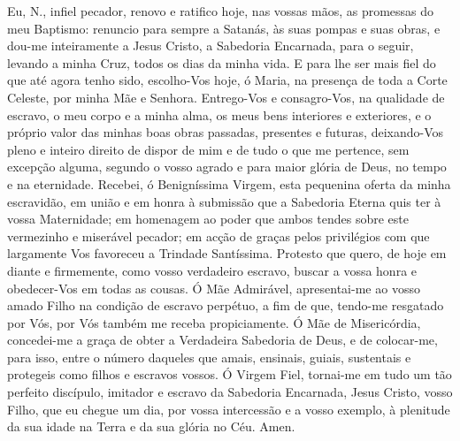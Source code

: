 Eu, {\redx N.}, infiel pecador, renovo e ratifico hoje, nas vossas mãos, as promessas do meu Baptismo: renuncio para sempre a Satanás, às suas pompas e suas obras, e dou-me inteiramente a Jesus Cristo, a Sabedoria Encarnada, para o seguir, levando a minha Cruz, todos os dias da minha vida. E para lhe ser mais fiel do que até agora tenho sido, escolho-Vos hoje, ó Maria, na presença de toda a Corte Celeste, por minha Mãe e Senhora. Entrego-Vos e consagro-Vos, na qualidade de escravo, o meu corpo e a minha alma, os meus bens interiores e exteriores, e o próprio valor das minhas boas obras passadas, presentes e futuras, deixando-Vos pleno e inteiro direito de dispor de mim e de tudo o que me pertence, sem excepção alguma, segundo o vosso agrado e para maior glória de Deus, no tempo e na eternidade.
Recebei, ó Benigníssima Virgem, esta pequenina oferta da minha escravidão, em união e em honra à submissão que a Sabedoria Eterna quis ter à vossa Maternidade; em homenagem ao poder que ambos tendes sobre este vermezinho e miserável pecador; em acção de graças pelos privilégios com que largamente Vos favoreceu a Trindade Santíssima.
Protesto que quero, de hoje em diante e firmemente, como vosso verdadeiro escravo, buscar a vossa honra e obedecer-Vos em todas as cousas.
Ó Mãe Admirável, apresentai-me ao vosso amado Filho na condição de escravo perpétuo, a fim de que, tendo-me resgatado por Vós, por Vós também me receba propiciamente.
Ó Mãe de Misericórdia, concedei-me a graça de obter a Verdadeira Sabedoria de Deus, e de colocar-me, para isso, entre o número daqueles que amais, ensinais, guiais, sustentais e protegeis como filhos e escravos vossos.
Ó Virgem Fiel, tornai-me em tudo um tão perfeito discípulo, imitador e escravo da Sabedoria Encarnada, Jesus Cristo, vosso Filho, que eu chegue um dia, por vossa intercessão e a vosso exemplo, à plenitude da sua idade na Terra e da sua glória no Céu. Amen.

